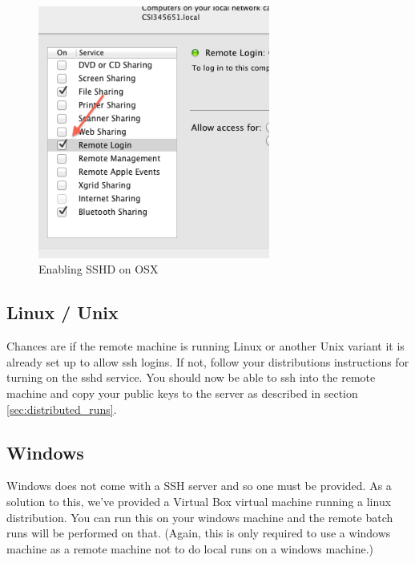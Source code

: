 \documentclass[11pt]{amsart}
\begin{document}
\begin{figure}[h]
\begin{center}
\vspace{.2in}
\centerline {
\includegraphics[width=3in]{images/sshd_on_osx.png}
}
\caption{Enabling SSHD on OSX}
\label{fig:osx_sys}
\end{center}
\end{figure}

\subsection{Linux / Unix}
Chances are if the remote machine is running Linux or another Unix variant it is already set up to allow ssh logins. If not, follow your distributions instructions for turning on the sshd service. You should now be able to ssh into the remote machine and copy your public keys to the server as described in section \ref{sec:distributed_runs}.

\subsection{Windows}

Windows does not come with a SSH server and so one must be provided. As a solution to this, we've provided a Virtual Box virtual machine running a linux distribution. You can run this on your windows machine and the remote batch runs will be performed on that. (Again, this  is only required to use a windows machine as a remote machine not to do local runs on a windows machine.)
\end{document}
